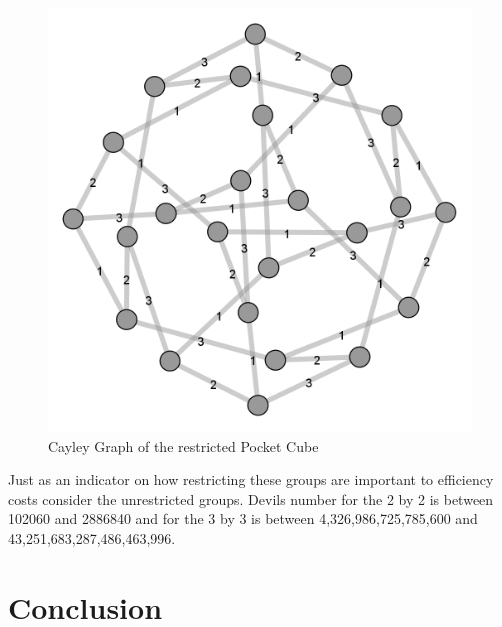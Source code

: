 \documentclass{article}
\begin{document}
\begin{figure}[h]
\includegraphics[scale=.15]{DoubleTurn.png}
\caption{Cayley Graph of the restricted Pocket Cube}
\label{fig:doubleturn}
\end{figure}

Just as an indicator on how restricting these groups are important to efficiency costs consider the unrestricted groups. Devils number for the 2 by 2 is between 102060 and 2886840 and for the 3 by 3 is between 4,326,986,725,785,600 and 43,251,683,287,486,463,996.

\newpage

\section{Conclusion}
\end{document}
